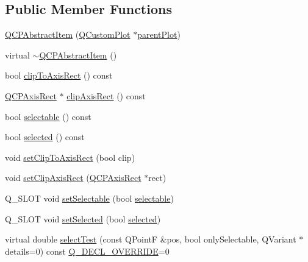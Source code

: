 \subsection*{Public Member Functions}
\begin{DoxyCompactItemize}
\item 
\mbox{\hyperlink{class_q_c_p_abstract_item_a9922507d8b4503a1fe1ed0b1030e23b6}{Q\+C\+P\+Abstract\+Item}} (\mbox{\hyperlink{class_q_custom_plot}{Q\+Custom\+Plot}} $\ast$\mbox{\hyperlink{class_q_c_p_layerable_a473edb813a4c1929d6b6a8fe3ff3faf7}{parent\+Plot}})
\item 
virtual \mbox{\hyperlink{class_q_c_p_abstract_item_a375bd1b7d3218b04a6ff7ff06fff917c}{$\sim$\+Q\+C\+P\+Abstract\+Item}} ()
\item 
bool \mbox{\hyperlink{class_q_c_p_abstract_item_a42715ad5f3d7fca6854025fa5636f436}{clip\+To\+Axis\+Rect}} () const
\item 
\mbox{\hyperlink{class_q_c_p_axis_rect}{Q\+C\+P\+Axis\+Rect}} $\ast$ \mbox{\hyperlink{class_q_c_p_abstract_item_ae162314efd3fe1a6d4df11da1d275d52}{clip\+Axis\+Rect}} () const
\item 
bool \mbox{\hyperlink{class_q_c_p_abstract_item_ae29aa489767352b40c4aaa7ea50c5582}{selectable}} () const
\item 
bool \mbox{\hyperlink{class_q_c_p_abstract_item_aa069fba320a13639f119f82ad29ead96}{selected}} () const
\item 
void \mbox{\hyperlink{class_q_c_p_abstract_item_a39e05b9d4176b9accafc746d16ca6a06}{set\+Clip\+To\+Axis\+Rect}} (bool clip)
\item 
void \mbox{\hyperlink{class_q_c_p_abstract_item_a7dc75fcbcd10206fe0b75d757ea7a347}{set\+Clip\+Axis\+Rect}} (\mbox{\hyperlink{class_q_c_p_axis_rect}{Q\+C\+P\+Axis\+Rect}} $\ast$rect)
\item 
Q\+\_\+\+S\+L\+OT void \mbox{\hyperlink{class_q_c_p_abstract_item_a8a8e32a55bc478b849756a78c2d87fd2}{set\+Selectable}} (bool \mbox{\hyperlink{class_q_c_p_abstract_item_ae29aa489767352b40c4aaa7ea50c5582}{selectable}})
\item 
Q\+\_\+\+S\+L\+OT void \mbox{\hyperlink{class_q_c_p_abstract_item_a203de94ad586cc44d16c9565f49d3378}{set\+Selected}} (bool \mbox{\hyperlink{class_q_c_p_abstract_item_aa069fba320a13639f119f82ad29ead96}{selected}})
\item 
virtual double \mbox{\hyperlink{class_q_c_p_abstract_item_ae41d0349d68bb802c49104afd100ba2a}{select\+Test}} (const Q\+PointF \&pos, bool only\+Selectable, Q\+Variant $\ast$details=0) const \mbox{\hyperlink{qcustomplot_8h_a42cc5eaeb25b85f8b52d2a4b94c56f55}{Q\+\_\+\+D\+E\+C\+L\+\_\+\+O\+V\+E\+R\+R\+I\+DE}}=0

\end{DoxyCompactItemize}
